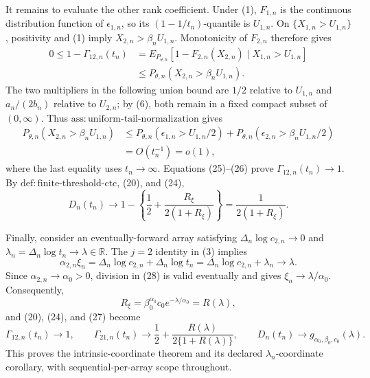 It remains to evaluate the other rank coefficient. Under (1), \(F_{1,n}\) is the continuous distribution function of \(\epsilon_{1,n}\), so its \((1-1/t_n)\)-quantile is \(U_{1,n}\). On \(\{X_{1,n}>U_{1,n}\}\), positivity and (1) imply \(X_{2,n}>\beta_nU_{1,n}\). Monotonicity of \(F_{2,n}\) therefore gives
\[
\begin{split}
0\leq1-\Gamma_{12,n}(t_n)
&=E_{P_{\theta,n}}[1-F_{2,n}(X_{2,n})\mid X_{1,n}>U_{1,n}]\\
&\leq P_{\theta,n}(X_{2,n}>\beta_nU_{1,n}).
\end{split}
\tag{25}
\]
The two multipliers in the following union bound are \(1/2\) relative to \(U_{1,n}\) and \(a_n/(2b_n)\) relative to \(U_{2,n}\); by (6), both remain in a fixed compact subset of \((0,\infty)\). Thus \(\mathrm{ass{:}uniform\text{-}tail\text{-}normalization}\) gives
\[
\begin{split}
P_{\theta,n}(X_{2,n}>\beta_nU_{1,n})
&\leq P_{\theta,n}(\epsilon_{1,n}>U_{1,n}/2)
+P_{\theta,n}(\epsilon_{2,n}>\beta_nU_{1,n}/2)\\
&=O(t_n^{-1})=o(1),
\end{split}
\tag{26}
\]
where the last equality uses \(t_n\to\infty\). Equations (25)--(26) prove \(\Gamma_{12,n}(t_n)\to1\). By \(\mathrm{def{:}finite\text{-}threshold\text{-}ctc}\), (20), and (24),
\[
D_n(t_n)
\longrightarrow
1-\left\{\frac12+\frac{R_\xi}{2(1+R_\xi)}\right\}
=\frac{1}{2(1+R_\xi)}.
\tag{27}
\]

Finally, consider an eventually-forward array satisfying \(\Delta_n\log c_{2,n}\to0\) and \(\lambda_n=\Delta_n\log t_n\to\lambda\in\mathbb R\). The \(j=2\) identity in (3) implies
\[
\alpha_{2,n}\xi_n
=\Delta_n\log c_{2,n}+\Delta_n\log t_n
=\Delta_n\log c_{2,n}+\lambda_n
\longrightarrow\lambda.
\tag{28}
\]
Since \(\alpha_{2,n}\to\alpha_0>0\), division in (28) is valid eventually and gives \(\xi_n\to\lambda/\alpha_0\). Consequently,
\[
R_\xi
=\beta_0^{\alpha_0}c_0e^{-\lambda/\alpha_0}
=R(\lambda),
\tag{29}
\]
and (20), (24), and (27) become
\[
\Gamma_{12,n}(t_n)\to1,
\qquad
\Gamma_{21,n}(t_n)\to\frac12+\frac{R(\lambda)}{2\{1+R(\lambda)\}},
\qquad
D_n(t_n)\to g_{\alpha_0,\beta_0,c_0}(\lambda).
\]
This proves the intrinsic-coordinate theorem and its declared \(\lambda_n\)-coordinate corollary, with sequential-per-array scope throughout.